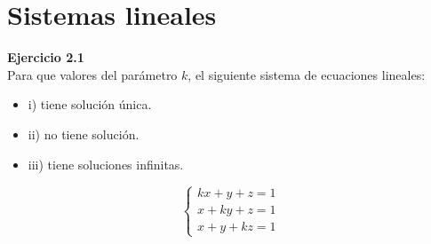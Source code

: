 \documentclass{article}
\newenvironment{problem}[2][Ejercicio]
    { \begin{mdframed}[backgroundcolor=gray!20] \textbf{#1 #2} \\}
    {  \end{mdframed}}
\begin{document}
\section{Sistemas lineales}\label{sec:sist-lineales}
\begin{problem}{2.1}

Para que valores del parámetro $k$, el siguiente sistema de ecuaciones lineales:
\begin{itemize}
\item 
i) tiene solución única.
\item 
ii) no tiene solución.
\item 
iii) tiene soluciones infinitas.
\end{itemize}
\[
\begin{cases}
kx + y + z = 1 \\
x + ky + z = 1 \\
x + y + kz = 1
\end{cases}
\]
\end{problem}
\end{document}

